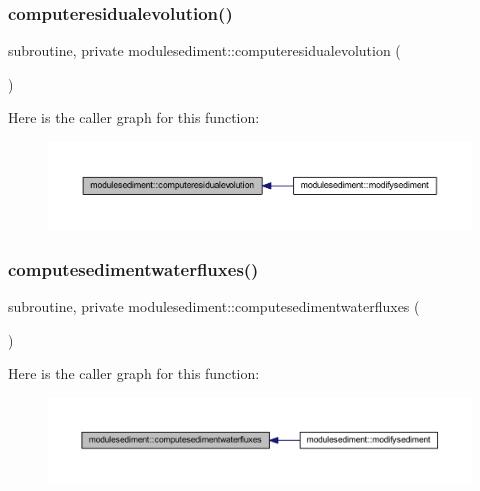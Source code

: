 \subsubsection{\texorpdfstring{computeresidualevolution()}{computeresidualevolution()}}
{\footnotesize\ttfamily subroutine, private modulesediment\+::computeresidualevolution (\begin{DoxyParamCaption}{ }\end{DoxyParamCaption})\hspace{0.3cm}{\ttfamily [private]}}

Here is the caller graph for this function\+:\nopagebreak
\begin{figure}[H]
\begin{center}
\leavevmode
\includegraphics[width=350pt]{namespacemodulesediment_ad51d2a28e0487a18346c78ef17c13307_icgraph}
\end{center}
\end{figure}
\mbox{\label{namespacemodulesediment_aef98ab4e43c91c6528368e12b3bc5199}} 
\subsubsection{\texorpdfstring{computesedimentwaterfluxes()}{computesedimentwaterfluxes()}}
{\footnotesize\ttfamily subroutine, private modulesediment\+::computesedimentwaterfluxes (\begin{DoxyParamCaption}{ }\end{DoxyParamCaption})\hspace{0.3cm}{\ttfamily [private]}}

Here is the caller graph for this function\+:\nopagebreak
\begin{figure}[H]
\begin{center}
\leavevmode
\includegraphics[width=350pt]{namespacemodulesediment_aef98ab4e43c91c6528368e12b3bc5199_icgraph}
\end{center}
\end{figure}
\mbox{\label{namespacemodulesediment_a0fc734d1e2e7bacc8606e169d198ead5}} 
